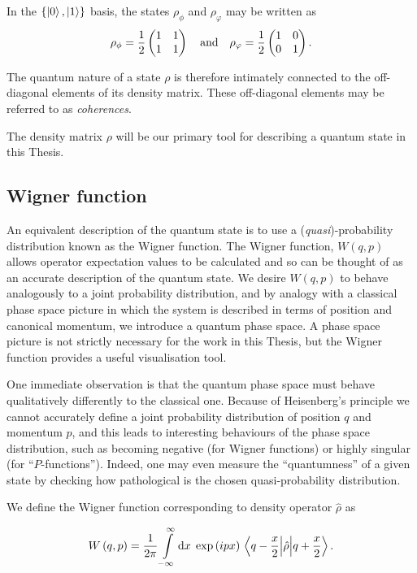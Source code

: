 In the $\left\{\ket{0}, \ket{1}\right\}$ basis, the states $\rho_\phi$ and $\rho_\varphi$ may be written as
\begin{equation}
\rho_\phi = \frac{1}{2}\pmqty{1 & 1 \\ 1 & 1} \qq{and} \rho_\varphi = \frac{1}{2}\pmqty{1 & 0 \\ 0  & 1}.
\end{equation}

\noindent The quantum nature of a state $\rho$ is therefore intimately connected to the off-diagonal elements of its density matrix. These off-diagonal elements may be referred to as \emph{coherences}. 

The density matrix $\rho$ will be our primary tool for describing a quantum state in this Thesis.


\FloatBarrier
\subsection{Wigner function}
An equivalent description of the quantum state is to use a (\emph{quasi})-probability distribution known as the Wigner function. The Wigner function, $W\left(q, p\right)$ allows operator expectation values to be calculated and so can be thought of as an accurate description of the quantum state. We desire $W\left(q, p\right)$ to behave analogously to a joint probability distribution, and by analogy with a classical phase space picture in which the system is described in terms of position and canonical momentum, we introduce a quantum phase space. A phase space picture is not strictly necessary for the work in this Thesis, but the Wigner function provides a useful visualisation tool.

One immediate observation is that the quantum phase space must behave qualitatively differently to the classical one. Because of Heisenberg's principle we cannot accurately define a joint probability distribution of position $q$ and momentum $p$, and this leads to interesting behaviours of the phase space distribution, such as becoming negative (for Wigner functions) or highly singular (for ``$P$-functions''). Indeed, one may even measure the ``quantumness'' of a given state by checking how pathological is the chosen quasi-probability distribution.

We define the Wigner function corresponding to density operator $\hat{\rho}$ as \cite{Leonhardt2010}

\begin{equation}
W\left(q, p\right) = \frac{1}{2 \pi} \int\limits_{-\infty}^{\infty} \mathrm{d}x \; \exp\left(i p x\right) \mel{q - \frac{x}{2}}{\hat{\rho}}{q + \frac{x}{2}}.
\end{equation}


